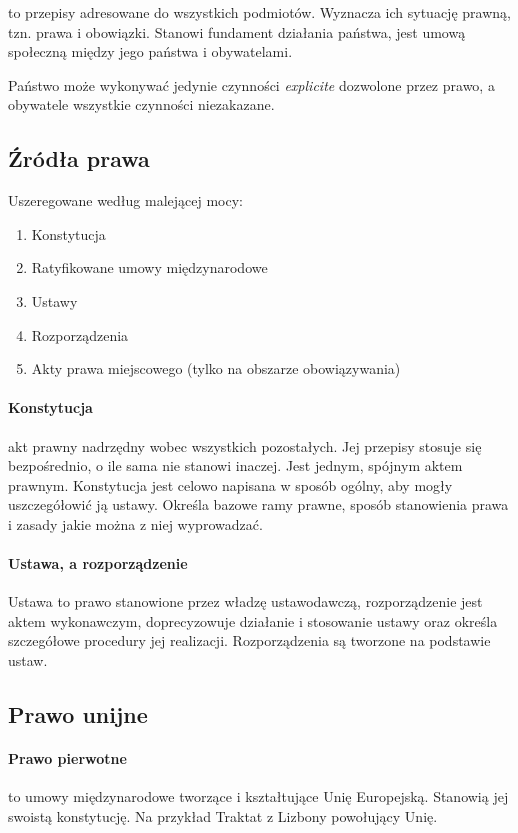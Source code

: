 \documentclass{article}
\begin{document}
to przepisy adresowane do wszystkich podmiotów.
Wyznacza ich sytuację prawną, tzn. prawa i obowiązki.
Stanowi fundament działania państwa,
jest umową społeczną między jego państwa i obywatelami.

Państwo może wykonywać jedynie czynności \textit{explicite} dozwolone przez prawo,
a obywatele wszystkie czynności niezakazane.

\subsection{Źródła prawa}

Uszeregowane według malejącej mocy:
\begin{enumerate}
  \item Konstytucja
  \item Ratyfikowane umowy międzynarodowe
  \item Ustawy
  \item Rozporządzenia
  \item Akty prawa miejscowego (tylko na obszarze obowiązywania)
\end{enumerate}

\paragraph{Konstytucja}

akt prawny nadrzędny wobec wszystkich pozostałych.
Jej przepisy stosuje się bezpośrednio, o ile sama nie stanowi inaczej.
Jest jednym, spójnym aktem prawnym. Konstytucja jest celowo napisana w sposób ogólny, aby mogły
uszczegółowić ją ustawy.
Określa bazowe ramy prawne, sposób stanowienia prawa i zasady jakie można z niej wyprowadzać.

\paragraph{Ustawa, a rozporządzenie}

Ustawa to prawo stanowione przez władzę ustawodawczą,
rozporządzenie jest aktem wykonawczym, doprecyzowuje działanie i stosowanie ustawy oraz określa
szczegółowe procedury jej realizacji. Rozporządzenia są tworzone na podstawie ustaw.

\subsection{Prawo unijne}

\paragraph{Prawo pierwotne}
to umowy międzynarodowe tworzące i kształtujące Unię Europejską. Stanowią jej swoistą konstytucję.
Na przykład Traktat z Lizbony powołujący Unię.
\end{document}
